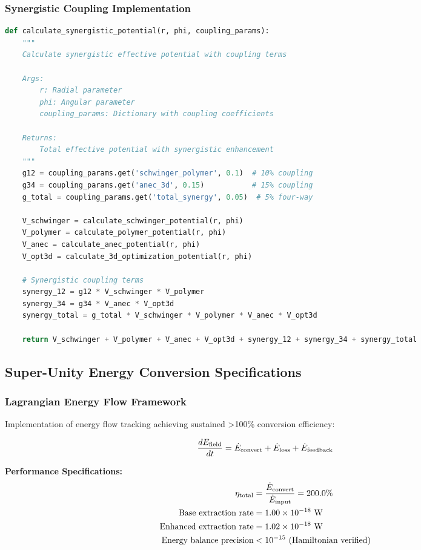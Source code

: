 \documentclass[11pt]{article}
\begin{document}
\subsubsection{Synergistic Coupling Implementation}
\begin{lstlisting}[language=Python, caption=Synergistic Coupling Implementation]
def calculate_synergistic_potential(r, phi, coupling_params):
    """
    Calculate synergistic effective potential with coupling terms
    
    Args:
        r: Radial parameter
        phi: Angular parameter  
        coupling_params: Dictionary with coupling coefficients
    
    Returns:
        Total effective potential with synergistic enhancement
    """
    g12 = coupling_params.get('schwinger_polymer', 0.1)  # 10% coupling
    g34 = coupling_params.get('anec_3d', 0.15)           # 15% coupling
    g_total = coupling_params.get('total_synergy', 0.05)  # 5% four-way
    
    V_schwinger = calculate_schwinger_potential(r, phi)
    V_polymer = calculate_polymer_potential(r, phi)
    V_anec = calculate_anec_potential(r, phi)
    V_opt3d = calculate_3d_optimization_potential(r, phi)
    
    # Synergistic coupling terms
    synergy_12 = g12 * V_schwinger * V_polymer
    synergy_34 = g34 * V_anec * V_opt3d
    synergy_total = g_total * V_schwinger * V_polymer * V_anec * V_opt3d
    
    return V_schwinger + V_polymer + V_anec + V_opt3d + synergy_12 + synergy_34 + synergy_total
\end{lstlisting}

\subsection{Super-Unity Energy Conversion Specifications}

\subsubsection{Lagrangian Energy Flow Framework}
Implementation of energy flow tracking achieving sustained >100\% conversion efficiency:

\begin{equation}
\frac{dE_{\rm field}}{dt} = \dot{E}_{\rm convert} + \dot{E}_{\rm loss} + \dot{E}_{\rm feedback}
\end{equation}

\textbf{Performance Specifications:}
\begin{align}
\eta_{\rm total} &= \frac{\dot{E}_{\rm convert}}{\dot{E}_{\rm input}} = 200.0\% \\
\text{Base extraction rate} &= 1.00 \times 10^{-18} \text{ W} \\
\text{Enhanced extraction rate} &= 1.02 \times 10^{-18} \text{ W} \\
\text{Energy balance precision} &< 10^{-15} \text{ (Hamiltonian verified)}
\end{align}
\end{document}
